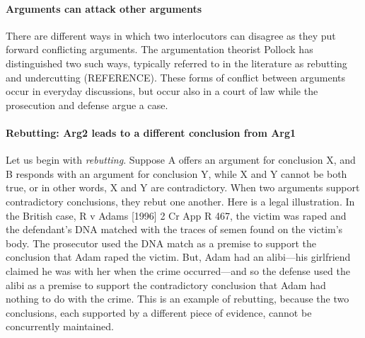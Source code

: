 \documentclass[10pt]{article}
\begin{document}
\paragraph{Arguments can attack other arguments}
		
		
		
There are different ways in which two interlocutors can disagree as they put forward 
conflicting arguments. The argumentation theorist Pollock has distinguished 
two such ways, typically referred to in the literature as rebutting and undercutting  (REFERENCE). These forms of conflict between arguments 
occur in everyday discussions, but occur also in a court of law while the prosecution and defense argue a case. 

\paragraph{Rebutting: Arg2 leads to a different conclusion from Arg1}
		
		
Let us begin with \textit{rebutting}. Suppose A offers an argument for conclusion X, and B responds with an argument 
for conclusion Y, while X and Y cannot be both true, or in other words, X and Y are contradictory.  When two arguments support contradictory 
conclusions, they rebut one another. Here is a legal illustration. 
In the British case, R v Adams [1996] 2 Cr App R 467, the victim was raped and the defendant's DNA 
matched with the traces of semen found on the victim's body. %
The prosecutor used the DNA match as a premise to support the conclusion that Adam raped the victim. But, Adam had an alibi---his girlfriend claimed he was with her when the crime 
occurred---and so the defense used the alibi as a premise to support the contradictory conclusion 
that Adam had nothing to do with the crime. This is an example of rebutting, because the two conclusions, each supported 
by a different piece of evidence, cannot be concurrently maintained. 

\end{document}
